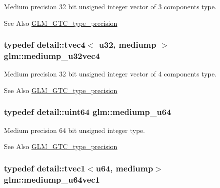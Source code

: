 Medium precision 32 bit unsigned integer vector of 3 components type. \begin{DoxySeeAlso}{See Also}
\hyperlink{group__gtc__type__precision}{G\-L\-M\-\_\-\-G\-T\-C\-\_\-type\-\_\-precision} 
\end{DoxySeeAlso}
\hypertarget{group__gtc__type__precision_ga532f59ac4c36a7e1371341165f7be33b}{
\subsubsection[{mediump\-\_\-u32vec4}]{\setlength{\rightskip}{0pt plus 5cm}typedef detail\-::tvec4$<$ u32, mediump $>$ {\bf glm\-::mediump\-\_\-u32vec4}}}\label{group__gtc__type__precision_ga532f59ac4c36a7e1371341165f7be33b}
Medium precision 32 bit unsigned integer vector of 4 components type. \begin{DoxySeeAlso}{See Also}
\hyperlink{group__gtc__type__precision}{G\-L\-M\-\_\-\-G\-T\-C\-\_\-type\-\_\-precision} 
\end{DoxySeeAlso}
\hypertarget{group__gtc__type__precision_ga00c51a16fa190b0a90205d50d6d8a44a}{
\subsubsection[{mediump\-\_\-u64}]{\setlength{\rightskip}{0pt plus 5cm}typedef detail\-::uint64 {\bf glm\-::mediump\-\_\-u64}}}\label{group__gtc__type__precision_ga00c51a16fa190b0a90205d50d6d8a44a}
Medium precision 64 bit unsigned integer type. \begin{DoxySeeAlso}{See Also}
\hyperlink{group__gtc__type__precision}{G\-L\-M\-\_\-\-G\-T\-C\-\_\-type\-\_\-precision} 
\end{DoxySeeAlso}
\hypertarget{group__gtc__type__precision_gaf4211dc9e211d57b34b45a612b6de193}{
\subsubsection[{mediump\-\_\-u64vec1}]{\setlength{\rightskip}{0pt plus 5cm}typedef detail\-::tvec1$<$u64, mediump$>$ {\bf glm\-::mediump\-\_\-u64vec1}}}\label{group__gtc__type__precision_gaf4211dc9e211d57b34b45a612b6de193}
